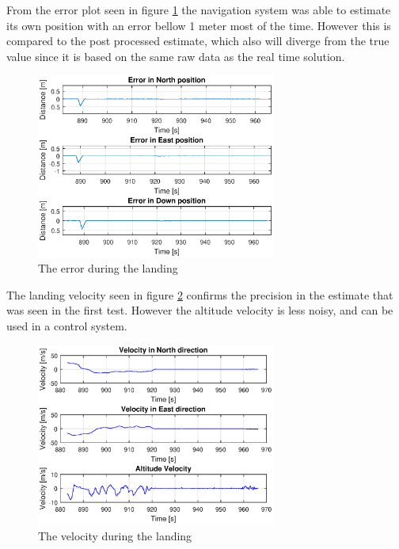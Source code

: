 From the error plot seen in figure \ref{figure:landingErrorNorthEastDownFlight} the navigation system was able to estimate its own position with an error bellow 1 meter most of the time. However this is compared to the post processed estimate, which also will diverge from the true value since it is based on the same raw data as the real time solution.

\begin{figure}[H]
	\centering
		\includegraphics[width=0.7\textwidth]{figs/plots/landingErrorNorthEastDownFlight.eps}
		\caption{The error during the landing}
		\label{figure:landingErrorNorthEastDownFlight}
\end{figure}
The landing velocity seen in figure \ref{figure:landingVelocity} confirms the precision in the estimate that was seen in the first test. However the altitude velocity is less noisy, and can be used in a control system.
\begin{figure}[H]
	\centering
		\includegraphics[width=0.7\textwidth]{figs/plots/landingVelocity.eps}
		\caption{The velocity during the landing}
		\label{figure:landingVelocity}
\end{figure}
\cleardoublepage